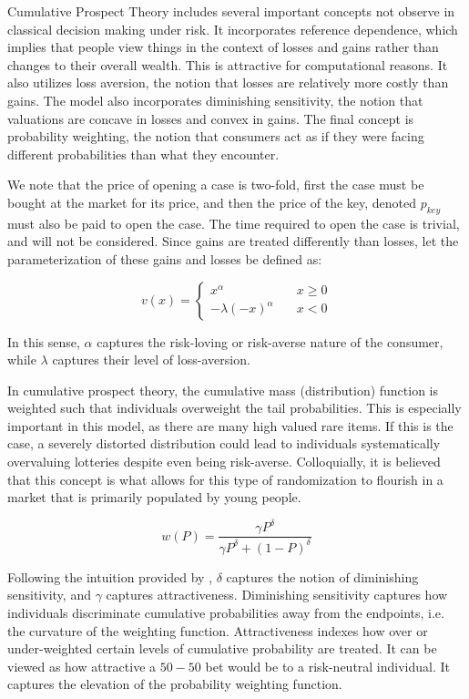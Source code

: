 \documentclass[12pt]{paper}
\begin{document}
Cumulative Prospect Theory includes several important concepts not
observe in classical decision making under risk. It incorporates
reference dependence, which implies that people view things in the
context of losses and gains rather than changes to their overall
wealth. This is attractive for computational reasons. It also utilizes
loss aversion, the notion that losses are relatively more costly than
gains. The model also incorporates diminishing sensitivity, the notion
that valuations are concave in losses and convex in gains. The final
concept is probability weighting, the notion that consumers act as if
they were facing different probabilities than what they encounter.

We note that the price of opening a case is two-fold, first the case
must be bought at the market for its price, and then the price of the
key, denoted $p_{key}$ must also be paid to open the case. The time
required to open the case is trivial, and will not be
considered. Since gains are treated differently than losses, let the
parameterization of these gains and losses be defined as:

\begin{equation*}
  v(x) =
  \begin{cases}
    x^\alpha \quad &x \geq 0\\
    -\lambda(-x)^\alpha \quad &x < 0
  \end{cases}
\end{equation*}

In this sense, $\alpha$ captures the risk-loving or risk-averse nature of
the consumer, while $\lambda$ captures their level of loss-aversion.

In cumulative prospect theory, the cumulative mass (distribution)
function is weighted such that individuals overweight the tail
probabilities. This is especially important in this model, as there are
many high valued rare items. If this is the case, a severely distorted
distribution could lead to individuals systematically overvaluing
lotteries despite even being risk-averse. Colloquially, it is believed
that this concept is what allows for this type of randomization to
flourish in a market that is primarily populated by young people.

\begin{equation*}
  w(P) = \frac{ \gamma P^\delta }{ \gamma P^\delta + (1-P)^\delta }
\end{equation*}

Following the intuition provided by \cite{GONZALEZ1999129}, $\delta$
captures the notion of diminishing sensitivity,
and $\gamma$ captures attractiveness. Diminishing sensitivity captures how
individuals discriminate cumulative probabilities away from the
endpoints, i.e. the curvature of the weighting
function. Attractiveness indexes how over or under-weighted certain
levels of cumulative probability are treated. It can be viewed as how
attractive a $50-50$ bet would be to a risk-neutral individual. It
captures the elevation of the probability weighting function.
\end{document}
